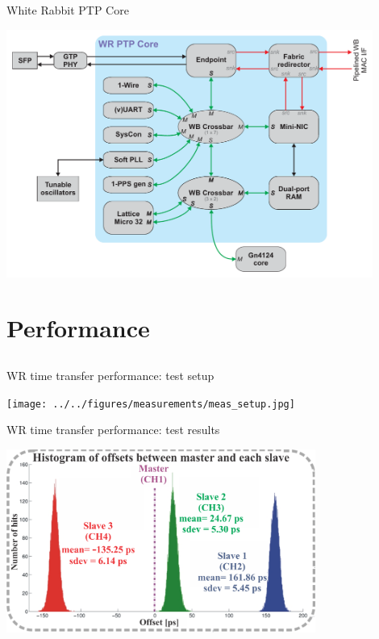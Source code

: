 \documentclass[compress, red]{beamer}
\begin{document}
\begin{frame}{White Rabbit PTP Core}
 \begin{center}
   \includegraphics[width=0.9\textwidth]{../../figures/node/wrpc_inside.pdf}
   \end{center}
\end{frame}


\section{Performance}
\subsection{}
\begin{frame}{WR time transfer performance: test setup}

    \begin{center}
    \texttt{[image: ../../figures/measurements/meas\_setup.jpg]}
    \end{center}

\end{frame}

\begin{frame}{WR time transfer performance: test results}

    \begin{center}
    \includegraphics[height=6.0cm]{../../figures/measurements/meas_results.pdf}
    \end{center}

\end{frame}
\end{document}
